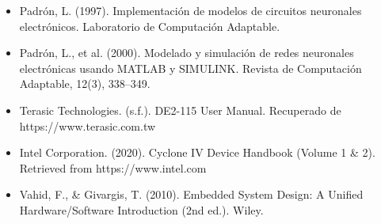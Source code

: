 \begin{itemize}
\item Padrón, L. (1997). Implementación de modelos de circuitos neuronales electrónicos. Laboratorio de Computación Adaptable.
\item Padrón, L., et al. (2000). Modelado y simulación de redes neuronales electrónicas usando MATLAB y SIMULINK. Revista de Computación Adaptable, 12(3), 338–349.
\item Terasic Technologies. (s.f.). DE2-115 User Manual. Recuperado de https://www.terasic.com.tw
\item Intel Corporation. (2020). Cyclone IV Device Handbook (Volume 1 \& 2). Retrieved from https://www.intel.com
\item Vahid, F., \& Givargis, T. (2010). Embedded System Design: A Unified Hardware/Software Introduction (2nd ed.). Wiley.
\end{itemize}
















\endinput 

